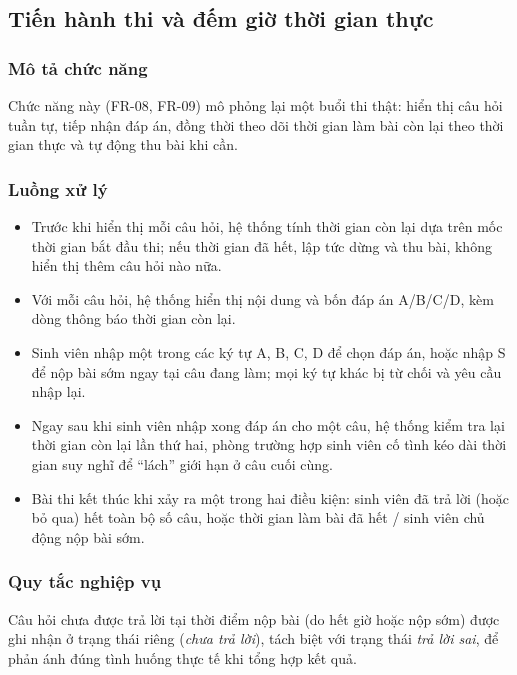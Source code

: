 \documentclass[11pt]{report}
\begin{document}
\subsection{Tiến hành thi và đếm giờ thời gian thực}

\subsubsection{Mô tả chức năng}

Chức năng này (FR-08, FR-09) mô phỏng lại một buổi thi thật: hiển thị câu hỏi tuần tự, tiếp nhận đáp án, đồng thời theo dõi thời gian làm bài còn lại theo thời gian thực và tự động thu bài khi cần.

\subsubsection{Luồng xử lý}

\begin{itemize}[leftmargin=*]
    \item Trước khi hiển thị mỗi câu hỏi, hệ thống tính thời gian còn lại dựa trên mốc thời gian bắt đầu thi; nếu thời gian đã hết, lập tức dừng và thu bài, không hiển thị thêm câu hỏi nào nữa.
    \item Với mỗi câu hỏi, hệ thống hiển thị nội dung và bốn đáp án A/B/C/D, kèm dòng thông báo thời gian còn lại.
    \item Sinh viên nhập một trong các ký tự A, B, C, D để chọn đáp án, hoặc nhập S để nộp bài sớm ngay tại câu đang làm; mọi ký tự khác bị từ chối và yêu cầu nhập lại.
    \item Ngay sau khi sinh viên nhập xong đáp án cho một câu, hệ thống kiểm tra lại thời gian còn lại lần thứ hai, phòng trường hợp sinh viên cố tình kéo dài thời gian suy nghĩ để ``lách'' giới hạn ở câu cuối cùng.
    \item Bài thi kết thúc khi xảy ra một trong hai điều kiện: sinh viên đã trả lời (hoặc bỏ qua) hết toàn bộ số câu, hoặc thời gian làm bài đã hết / sinh viên chủ động nộp bài sớm.
\end{itemize}

\subsubsection{Quy tắc nghiệp vụ}

Câu hỏi chưa được trả lời tại thời điểm nộp bài (do hết giờ hoặc nộp sớm) được ghi nhận ở trạng thái riêng (\textit{chưa trả lời}), tách biệt với trạng thái \textit{trả lời sai}, để phản ánh đúng tình huống thực tế khi tổng hợp kết quả.
\end{document}

